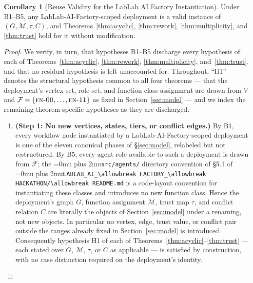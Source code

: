 \documentclass[12pt]{article}
\theoremstyle{definition}
\newtheorem{corollary}[theorem]{Corollary}
\DeclareRobustCommand{\code}[1]{\begingroup\Urlmuskip=0mu plus 2mu\relax\nolinkurl{#1}\endgroup}
\newcommand{\FN}[1]{\textsc{fn-#1}}
\newcommand{\LabLabFactoryReadme}{\code{LABLAB\_AI\_\allowbreak FACTORY\_\allowbreak HACKATHON/\allowbreak README.md}}
\begin{document}
\begin{corollary}[Reuse Validity for the LabLab AI Factory Instantiation]
\label{cor:lablab-factory-reuse}
Under B1--B5, any LabLab-AI-Factory-scoped deployment is a valid
instance of $(G, \mathcal{M}, \tau, C)$, and
Theorems~\ref{thm:acyclic}, \ref{thm:rework}, \ref{thm:multiplicity},
and \ref{thm:trust} hold for it without modification.
\end{corollary}

\begin{proof}
We verify, in turn, that hypotheses B1--B5 discharge every hypothesis
of each of Theorems~\ref{thm:acyclic}, \ref{thm:rework},
\ref{thm:multiplicity}, and~\ref{thm:trust}, and that no residual
hypothesis is left unaccounted for. Throughout, ``H1'' denotes the
structural hypothesis common to all four theorems --- that the
deployment's vertex set, role set, and function-class assignment are
drawn from $V$ and $\mathcal{F} = \{\FN{00},\ldots,\FN{11}\}$ as fixed
in Section~\ref{sec:model} --- and we index the remaining
theorem-specific hypotheses as they are discharged.

\begin{enumerate}
    \item \textbf{(Step 1: No new vertices, states, tiers, or conflict
          edges.)} By B1, every workflow node instantiated by a
          LabLab-AI-Factory-scoped deployment is one of the eleven
          canonical phases of \S\ref{sec:model}, relabeled but not
          restructured. By B5, every agent role available to such a
          deployment is drawn from $\mathcal{F}$; the
          \code{src/agents/} directory convention of \S5.1 of
          \LabLabFactoryReadme{} is a code-layout convention for
          instantiating these classes and introduces no new function
          class. Hence the deployment's graph $G$, function assignment
          $\mathcal{M}$, trust map $\tau$, and conflict relation $C$
          are literally the objects of Section~\ref{sec:model} under a
          renaming, not new objects. In particular no vertex, edge,
          trust value, or conflict pair outside the ranges already
          fixed in Section~\ref{sec:model} is introduced. Consequently
          hypothesis H1 of each of
          Theorems~\ref{thm:acyclic}--\ref{thm:trust} --- each stated
          over $G$, $\mathcal{M}$, $\tau$, or $C$ as applicable --- is
          satisfied by construction, with no case distinction required
          on the deployment's identity.


\end{enumerate}
\end{proof}
\end{document}
